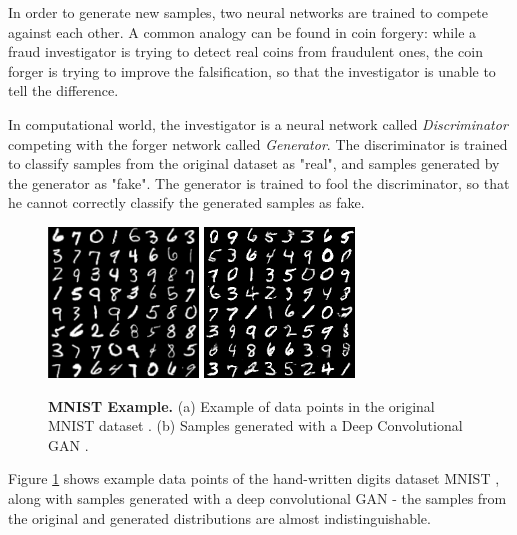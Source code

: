 \documentclass{article}
\begin{document}
In order to generate new samples, two neural networks are trained to compete against each other. A common analogy can be found in coin forgery: while a fraud investigator is trying to detect real coins from fraudulent ones, the coin forger is trying to improve the falsification, so that the investigator is unable to tell the difference.

In computational world, the investigator is a neural network called \textit{Discriminator} competing with the forger network called \textit{Generator}. The discriminator is trained to classify samples from the original dataset as "real", and samples generated by the generator as "fake". The generator is trained to fool the discriminator, so that he cannot correctly classify the generated samples as fake.

\begin{figure}[h]
\centering
{}
{\includegraphics[height=4cm]{GAN/mnist_orig}}\hspace{1cm}
{\includegraphics[height=4cm]{GAN/mnist_dcgan}}
\caption{\label{fig:mnist} \textbf{MNIST Example.}
(a) Example of data points in the original MNIST dataset \cite{lecun_mnist_nodate}. (b) Samples generated with a Deep Convolutional GAN \cite{kim_dcgan-tensorflow:_2018}.}
\end{figure}

Figure \ref{fig:mnist} shows example data points of the hand-written digits dataset MNIST \cite{lecun_mnist_nodate}, along with samples generated with a deep convolutional GAN \cite{kim_dcgan-tensorflow:_2018} - the samples from the original and generated distributions are almost indistinguishable.
\end{document}
